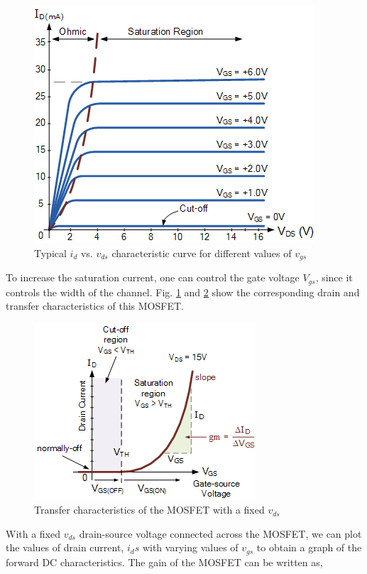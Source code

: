 \begin{figure}[H]
    \centering
    \includegraphics[width=0.65\columnwidth]{images/drain.png}
    \caption{Typical $i_d$ vs. $v_{ds}$ characteristic curve for different values of $v_{gs}$}
    \label{drain}
\end{figure}

To increase the saturation current, one can control the gate voltage $V_{gs}$, since it controls the width of the channel. Fig. \ref{drain} and \ref{trans} show the corresponding drain and transfer characteristics of this MOSFET.

\begin{figure}[H]
    \centering
    \includegraphics[width=0.65\columnwidth]{images/trans.png}
    \caption{Transfer characteristics of the MOSFET with a fixed $v_{ds}$}
    \label{trans}
\end{figure}

With a fixed $v_{ds}$ drain-source voltage connected across the MOSFET, we can plot the values of drain current, $i_ds$ with varying values of $v_{gs}$ to obtain a graph of the forward DC characteristics. The gain of the MOSFET can be written as,

